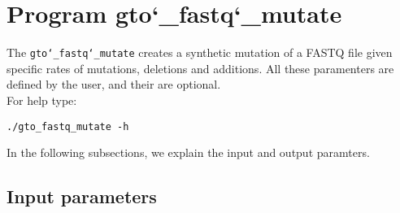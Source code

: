 \section{Program gto\char`_fastq\char`_mutate}
The \texttt{gto\char`_fastq\char`_mutate} creates a synthetic mutation of a FASTQ file given specific rates of mutations, deletions and additions. All these paramenters are defined by the user, and their are optional.\\
For help type:
\begin{lstlisting}
./gto_fastq_mutate -h
\end{lstlisting}
In the following subsections, we explain the input and output paramters.

\subsection*{Input parameters}

